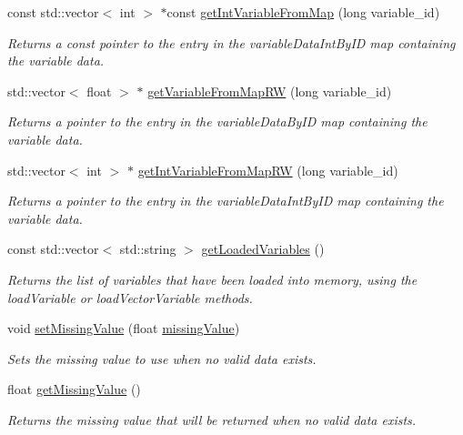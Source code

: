 \begin{DoxyCompactItemize}
const std\-::vector$<$ int $>$ $\ast$const \hyperlink{classccmc_1_1_model_a6e4c1576e63741d535e06f30c19b6a8b}{get\-Int\-Variable\-From\-Map} (long variable\-\_\-id)
\begin{DoxyCompactList}\small\item\em Returns a const pointer to the entry in the variable\-Data\-Int\-By\-I\-D map containing the variable data. \end{DoxyCompactList}\item 
std\-::vector$<$ float $>$ $\ast$ \hyperlink{classccmc_1_1_model_a4479c4d2ef1014452d91ba055d16abd2}{get\-Variable\-From\-Map\-R\-W} (long variable\-\_\-id)
\begin{DoxyCompactList}\small\item\em Returns a pointer to the entry in the variable\-Data\-By\-I\-D map containing the variable data. \end{DoxyCompactList}\item 
std\-::vector$<$ int $>$ $\ast$ \hyperlink{classccmc_1_1_model_aece24ca9849cebe22461c32eb6051d44}{get\-Int\-Variable\-From\-Map\-R\-W} (long variable\-\_\-id)
\begin{DoxyCompactList}\small\item\em Returns a pointer to the entry in the variable\-Data\-Int\-By\-I\-D map containing the variable data. \end{DoxyCompactList}\item 
const std\-::vector$<$ std\-::string $>$ \hyperlink{classccmc_1_1_model_ac49a0eec99d25e9ed08ffff959e4ecdc}{get\-Loaded\-Variables} ()
\begin{DoxyCompactList}\small\item\em Returns the list of variables that have been loaded into memory, using the load\-Variable or load\-Vector\-Variable methods. \end{DoxyCompactList}\item 
void \hyperlink{classccmc_1_1_model_a45b6caeedf03832524c1ee4577eb31b2}{set\-Missing\-Value} (float \hyperlink{classccmc_1_1_model_ae18cabca92352739be2b97f0ee973475}{missing\-Value})
\begin{DoxyCompactList}\small\item\em Sets the missing value to use when no valid data exists. \end{DoxyCompactList}\item 
float \hyperlink{classccmc_1_1_model_aaf909e4165fadb7e6676b49b24df5395}{get\-Missing\-Value} ()
\begin{DoxyCompactList}\small\item\em Returns the missing value that will be returned when no valid data exists. \end{DoxyCompactList}\item 

\end{DoxyCompactItemize}
